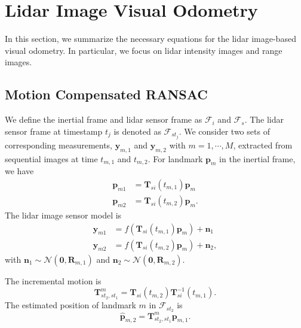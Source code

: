\section{Lidar Image Visual Odometry}
In this section, we summarize the necessary equations for the lidar image-based visual odometry. In particular, we focus on lidar intensity images and range images. 

\subsection{Motion Compensated RANSAC}

We define the inertial frame and lidar sensor frame as $\mathcal{F}_i$ and $\mathcal{F}_s$. The lidar sensor frame at timestamp $t_j$ is denoted as $\mathcal{F}_{st_j}$. We consider two sets of corresponding measurements, $\mathbf{y}_{m,1}$ and $\mathbf{y}_{m,2}$ with ${m=1,\cdots,M}$, extracted from sequential images at time $t_{m,1}$ and $t_{m,2}$. For landmark $\mathbf{p}_m$ in the inertial frame, we have
\begin{equation}
\begin{split}
    \mathbf{p}_{m1} &= \mathbf{T}_{si}(t_{m,1})\mathbf{p}_m \\
    \mathbf{p}_{m2} &= \mathbf{T}_{si}(t_{m,2})\mathbf{p}_m.
\end{split}
\end{equation}
The lidar image sensor model is
\begin{equation}
\begin{split}
    \mathbf{y}_{m1} &= f\left(\mathbf{T}_{si}(t_{m,1})\mathbf{p}_m \right) + \mathbf{n}_1\\
    \mathbf{y}_{m2} &= f\left(\mathbf{T}_{si}(t_{m,2})\mathbf{p}_m \right) + \mathbf{n}_2,
\end{split}
\end{equation}
with $\mathbf{n}_1 \sim \mathcal{N}(\mathbf{0}, \mathbf{R}_{m,1})$ and $\mathbf{n}_2 \sim \mathcal{N}(\mathbf{0}, \mathbf{R}_{m,2})$.

The incremental motion is 
\begin{equation}
    \mathbf{T}_{st_2, st_1}^{m} = \mathbf{T}_{si}(t_{m,2})\mathbf{T}_{si}^{-1}(t_{m,1}).
\end{equation}
The estimated position of landmark $m$ in $\mathcal{F}_{st_2}$ is 
\begin{equation}
    \hat{\mathbf{p}}_{m,2} = \mathbf{T}_{st_2, st_1}^{m} \mathbf{p}_{m,1}.
\end{equation}

